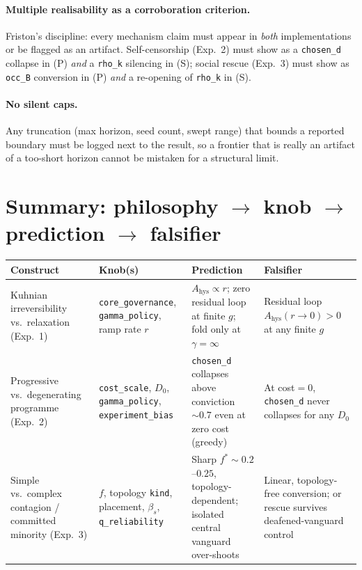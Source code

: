 \documentclass[11pt]{article}
\newcommand{\param}[1]{\texttt{#1}}
\begin{document}
\paragraph{Multiple realisability as a corroboration criterion.}
Friston's discipline: every mechanism claim must appear in \emph{both}
implementations or be flagged as an artifact. Self-censorship (Exp.~2) must show
as a \param{chosen\_d} collapse in (P) \emph{and} a \param{rho\_k} silencing in
(S); social rescue (Exp.~3) must show as \param{occ\_B} conversion in (P)
\emph{and} a re-opening of \param{rho\_k} in (S).

\paragraph{No silent caps.}
Any truncation (max horizon, seed count, swept range) that bounds a reported
boundary must be logged next to the result, so a frontier that is really an
artifact of a too-short horizon cannot be mistaken for a structural limit.

\section{Summary: philosophy $\to$ knob $\to$ prediction $\to$ falsifier}

\begin{center}
\renewcommand{\arraystretch}{1.35}
\begin{tabular}{@{}p{2.3cm} p{3.0cm} p{3.4cm} p{3.6cm}@{}}
\toprule
\textbf{Construct} & \textbf{Knob(s)} & \textbf{Prediction} & \textbf{Falsifier} \\
\midrule
Kuhnian irreversibility vs.\ relaxation (Exp.~1)
& \param{core\_governance}, \param{gamma\_policy}, ramp rate $r$
& $A_{\text{hys}}\!\propto\! r$; zero residual loop at finite $g$; fold only at $\gamma{=}\infty$
& Residual loop $A_{\text{hys}}(r{\to}0)>0$ at any finite $g$ \\
Progressive vs.\ degenerating programme (Exp.~2)
& \param{cost\_scale}, $D_0$, \param{gamma\_policy}, \param{experiment\_bias}
& \param{chosen\_d} collapses above conviction $\sim0.7$ even at zero cost (greedy)
& At cost${=}0$, \param{chosen\_d} never collapses for any $D_0$ \\
Simple vs.\ complex contagion / committed minority (Exp.~3)
& $f$, topology \param{kind}, placement, $\beta_s$, \param{q\_reliability}
& Sharp $f^{*}\!\sim\!0.2$--$0.25$, topology-dependent; isolated central vanguard over-shoots
& Linear, topology-free conversion; or rescue survives deafened-vanguard control \\
\bottomrule
\end{tabular}
\end{center}
\end{document}
